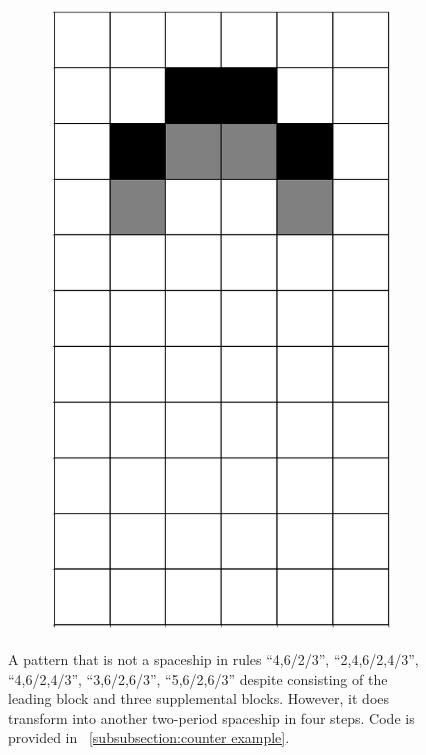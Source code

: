\documentclass[12pt]{article}
\numberwithin{figure}{section} %
\begin{document}
\begin{figure}[H]
\begin{subfigure}{0.19\textwidth}
     		\includegraphics[width=\linewidth]{Section4/2.4}
   	\end{subfigure}
   	\caption[A non-spaceship that looks like one]{A pattern that is not a spaceship in rules “4,6/2/3”, “2,4,6/2,4/3”, “4,6/2,4/3”, “3,6/2,6/3”, “5,6/2,6/3” despite consisting of the leading block and three supplemental blocks. However, it does transform into another two-period spaceship in four steps. Code is provided in ~\ref{subsubsection:counter example}.}
   	\label{fig:counter example}
   	\vspace{-1.5em}
\end{figure}
\end{document}

